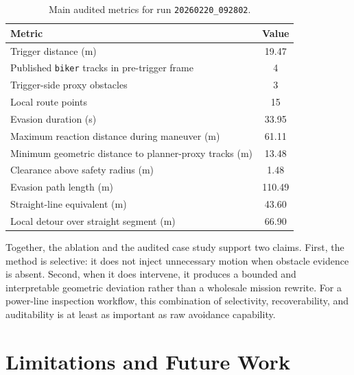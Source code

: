 \documentclass[journal,twoside,web]{ieeecolor}
\begin{document}
\begin{table}[t]
    \centering
    \small
    \begin{tabular}{@{}p{} S[table-format=3.2]@{}}
        \toprule
        \textbf{Metric} & {\textbf{Value}} \\
        \midrule
        Trigger distance (m) & 19.47 \\
        Published \texttt{biker} tracks in pre-trigger frame & 4 \\
        Trigger-side proxy obstacles & 3 \\
        Local route points & 15 \\
        Evasion duration (s) & 33.95 \\
        Maximum reaction distance during maneuver (m) & 61.11 \\
        Minimum geometric distance to planner-proxy tracks (m) & 13.48 \\
        Clearance above safety radius (m) & 1.48 \\
        Evasion path length (m) & 110.49 \\
        Straight-line equivalent (m) & 43.60 \\
        Local detour over straight segment (m) & 66.90 \\
        \bottomrule
    \end{tabular}
    \caption{Main audited metrics for run \texttt{20260220\_092802}.}
    \label{tab:case}
\end{table}

Together, the ablation and the audited case study support two claims. First, the method is selective: it does not inject unnecessary motion when obstacle evidence is absent. Second, when it does intervene, it produces a bounded and interpretable geometric deviation rather than a wholesale mission rewrite. For a power-line inspection workflow, this combination of selectivity, recoverability, and auditability is at least as important as raw avoidance capability.


\section{Limitations and Future Work}
\end{document}
